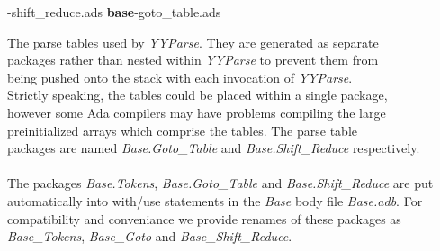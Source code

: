 -shift\_reduce.ads  {\bf base}-goto\_table.ads

\indent The parse tables used by {\it YYParse}.  They are generated as separate\\
\indent  packages rather than nested within {\it YYParse}
to prevent them from \\
 \indent being pushed onto the stack with each invocation of {\it YYParse}.\\
\indent Strictly speaking, the tables could be placed within a single
package,\\
\indent however some Ada compilers may have problems
compiling the large\\
\indent  preinitialized arrays which comprise the tables.  The
parse table\\
\indent packages are named {\it Base.Goto\_Table} and
{\it Base.Shift\_Reduce} respectively.\\
\\
The packages {\it Base.Tokens}, {\it Base.Goto\_Table} and 
{\it Base.Shift\_Reduce} are put automatically into with/use
statements in the {\it Base} body file {\it Base.adb}. For
compatibility and conveniance we provide renames of these
packages as {\it Base\_Tokens}, {\it Base\_Goto} and
{\it Base\_Shift\_Reduce}. 

